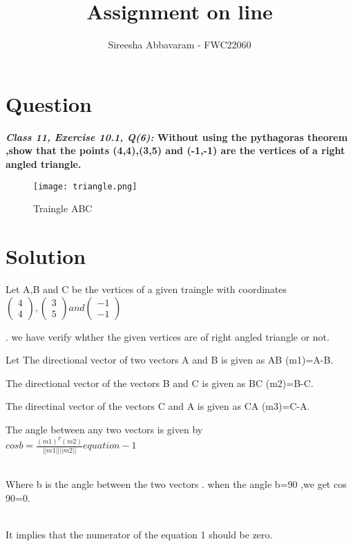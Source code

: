\documentclass[journal,12pt,twocolumn]{IEEEtran}
\title{\textbf{\\Assignment on line}}
\author{Sireesha Abbavaram - FWC22060}
\begin{document}
\maketitle


\section{Question}
\textbf{\textit{Class 11, Exercise 10.1, Q(6):} Without using the pythagoras theorem ,show that the points (4,4),(3,5) and (-1,-1) are the vertices of a right angled triangle.}

\begin{figure}[h!]
\centering
\texttt{[image: triangle.png]}
\centering
\caption{Traingle ABC}
\end{figure}


\section{Solution}
\raggedright 
\vspace{0.25cm}
Let A,B and C be the vertices of a given traingle with coordinates $\begin{pmatrix}
4 \\
4
\end{pmatrix}
, \begin{pmatrix}
3 \\
5
\end{pmatrix}
 and \begin{pmatrix}
-1 \\
-1
\end{pmatrix} $
\raggedright
. we have verify whther the given vertices are of right angled triangle or not.\\
\begin{center}
\raggedright
Let The directional vector of two vectors A and B is given as AB (m1)=A-B.
\end{center}
\vspace{0.25cm}
\begin{center}
The directional vector of the vectors B and C is given as BC (m2)=B-C.
\end{center}
\vspace{0.25cm}
\begin{center}
The directinal vector of the vectors C and A is given as CA (m3)=C-A.
\end{center}
\vspace{0.25cm}
The angle between any two vectors is given by
\boldmath
\\ $ cos b =\frac{(m1)^T(m2)}{||m1|| ||m2||}  equation-1$
\unboldmath
\vspace{0.5cm}\raggedright\\
Where b is the angle between the two vectors .
when the angle b=90 ,we get cos 90=0.
\vspace{0.5cm}\raggedright\\
It implies that the numerator of the equation 1 should be zero.
\end{document}
